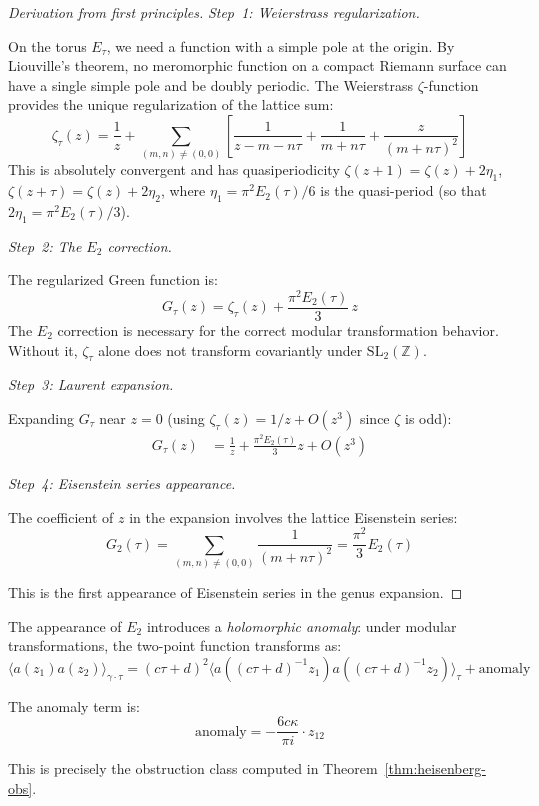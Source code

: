 \begin{proof}[Derivation from first principles]

\emph{Step~1: Weierstrass regularization.}

On the torus $E_\tau$, we need a function with a simple pole at the origin. By Liouville's theorem, no meromorphic function on a compact Riemann surface can have a single simple pole and be doubly periodic. The Weierstrass $\zeta$-function provides the unique regularization of the lattice sum:
\[\zeta_\tau(z) = \frac{1}{z} + \sum_{(m,n) \neq (0,0)} \left[\frac{1}{z - m - n\tau} + \frac{1}{m+n\tau} + \frac{z}{(m+n\tau)^2}\right]\]
This is absolutely convergent and has quasiperiodicity $\zeta(z+1) = \zeta(z) + 2\eta_1$, $\zeta(z+\tau) = \zeta(z) + 2\eta_2$, where $\eta_1 = \pi^2 E_2(\tau)/6$ is the quasi-period (so that $2\eta_1 = \pi^2 E_2(\tau)/3$).

\emph{Step~2: The $E_2$ correction.}

The regularized Green function is:
\[G_\tau(z) = \zeta_\tau(z) + \frac{\pi^2 E_2(\tau)}{3}\, z\]
The $E_2$ correction is necessary for the correct modular transformation behavior. Without it, $\zeta_\tau$ alone does not transform covariantly under $\mathrm{SL}_2(\mathbb{Z})$.

\emph{Step~3: Laurent expansion.}

Expanding $G_\tau$ near $z=0$ (using $\zeta_\tau(z) = 1/z + O(z^3)$ since $\zeta$ is odd):
\begin{align}
G_\tau(z) &= \frac{1}{z} + \frac{\pi^2 E_2(\tau)}{3} z + O(z^3)
\end{align}

\emph{Step~4: Eisenstein series appearance.}

The coefficient of $z$ in the expansion involves the lattice Eisenstein series:
\[G_2(\tau) = \sum_{(m,n) \neq (0,0)} \frac{1}{(m+n\tau)^2} = \frac{\pi^2}{3} E_2(\tau)\]

This is the first appearance of Eisenstein series in the genus expansion.
\end{proof}

\begin{remark}\label{rem:E2-holomorphic-anomaly}
The appearance of $E_2$ introduces a \emph{holomorphic anomaly}: under modular 
transformations, the two-point function transforms as:
\begin{equation}
\langle a(z_1) a(z_2) \rangle_{\gamma \cdot \tau} = (c\tau + d)^2 
\langle a((c\tau+d)^{-1}z_1) a((c\tau+d)^{-1}z_2) \rangle_\tau 
+ \text{anomaly}
\end{equation}

The anomaly term is:
\[\text{anomaly} = -\frac{6c\kappa}{\pi i} \cdot z_{12}\]

This is precisely the obstruction class computed in Theorem~\ref{thm:heisenberg-obs}.
\end{remark}

